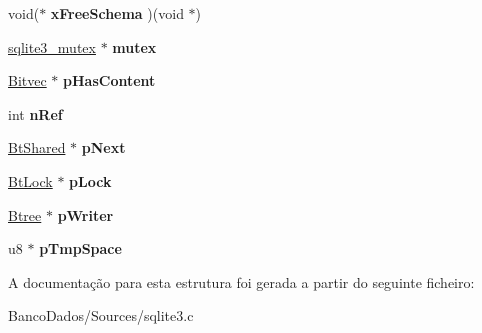 \begin{DoxyCompactItemize}
\item 
\hypertarget{struct_bt_shared_a7c4816c63acea30ed44ffc58b468463e}{void($\ast$ {\bfseries x\-Free\-Schema} )(void $\ast$)}\label{struct_bt_shared_a7c4816c63acea30ed44ffc58b468463e}

\item 
\hypertarget{struct_bt_shared_a454c31d726220bbed43c165e370460c8}{\hyperlink{structsqlite3__mutex}{sqlite3\-\_\-mutex} $\ast$ {\bfseries mutex}}\label{struct_bt_shared_a454c31d726220bbed43c165e370460c8}

\item 
\hypertarget{struct_bt_shared_ace6191dc3f48f9575d7946ab8cf5b919}{\hyperlink{struct_bitvec}{Bitvec} $\ast$ {\bfseries p\-Has\-Content}}\label{struct_bt_shared_ace6191dc3f48f9575d7946ab8cf5b919}

\item 
\hypertarget{struct_bt_shared_a43d0226fa08d7fae5f992f3a2d72cc08}{int {\bfseries n\-Ref}}\label{struct_bt_shared_a43d0226fa08d7fae5f992f3a2d72cc08}

\item 
\hypertarget{struct_bt_shared_aaa9dd5c5d4ec2bb79ebe4b37ee926ae3}{\hyperlink{struct_bt_shared}{Bt\-Shared} $\ast$ {\bfseries p\-Next}}\label{struct_bt_shared_aaa9dd5c5d4ec2bb79ebe4b37ee926ae3}

\item 
\hypertarget{struct_bt_shared_af58c79eec88f99ed5a07d8cabf8a1d1a}{\hyperlink{struct_bt_lock}{Bt\-Lock} $\ast$ {\bfseries p\-Lock}}\label{struct_bt_shared_af58c79eec88f99ed5a07d8cabf8a1d1a}

\item 
\hypertarget{struct_bt_shared_ad8b2679e54027d58a3be3afcca4df1d6}{\hyperlink{struct_btree}{Btree} $\ast$ {\bfseries p\-Writer}}\label{struct_bt_shared_ad8b2679e54027d58a3be3afcca4df1d6}

\item 
\hypertarget{struct_bt_shared_a89102c20327da8a304f7e95af557bdf4}{u8 $\ast$ {\bfseries p\-Tmp\-Space}}\label{struct_bt_shared_a89102c20327da8a304f7e95af557bdf4}

\end{DoxyCompactItemize}


A documentação para esta estrutura foi gerada a partir do seguinte ficheiro\-:\begin{DoxyCompactItemize}
\item 
Banco\-Dados/\-Sources/sqlite3.\-c\end{DoxyCompactItemize}
